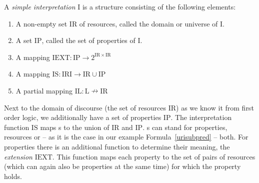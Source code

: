 



\begin{definition}\label{si}
A \emph{simple interpretation} $\mathrm{I}$ is a structure consisting of the following elements:
\begin{enumerate}
 \item A non-empty set $\mathrm{IR}$ of resources, called the domain or universe of $\mathrm{I}$.
 \item A set $\mathrm{IP}$, called the set of properties of $\mathrm{I}$.
 \item A mapping $\mathrm{IEXT}: \mathrm{IP} \rightarrow 2^{\mathrm{IR}\times \mathrm{IR}}$
 \item A mapping $\mathrm{IS}:\mathrm{IRI}\rightarrow \mathrm{IR}\cup \mathrm{IP}$
 \item A partial mapping $\mathrm{IL}:\mathrm{L} \nrightarrow \mathrm{IR}$
\end{enumerate}
\end{definition}
Next to the domain of discourse (the set of resources $\mathrm{IR}$) as we know it from first order logic,  we additionally have 
a set of properties $\mathrm{IP}$.
The interpretation function $\mathrm{IS}$ maps \iri{}s to the union of $\mathrm{IR}$ and $\mathrm{IP}$. 
\iri{}s can stand for properties, resources or -- as it is the case in our example Formula~\ref{urisubpred} -- both. 
For properties there is an additional function to determine their meaning, the \emph{extension} $\mathrm{IEXT}$. 
This function  maps  each property to the set of pairs of resources (which can again also be properties at the same time) for which the property holds.
